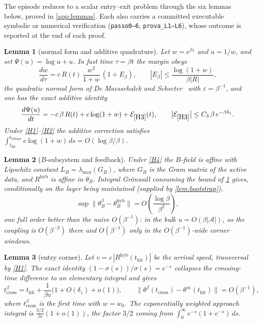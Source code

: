 \documentclass[11pt]{article}
\newtheorem{lemma}[lemma]{Lemma}
\theoremstyle{definition}
\theoremstyle{remark}
\newcommand{\thit}{t_{\mathrm{hit}}}
\newcommand{\trel}{t_{\mathrm{release}}}
\newcommand{\Ar}{\mathcal{A}}                      %
\newcommand{\hyb}{\mathrm{hyb}}
\begin{document}
The episode reduces to a scalar entry--exit problem through the six lemmas below,
proved in \cref{app:lemmas}. Each also carries a committed executable symbolic or
numerical verification (\texttt{passo0--6}, \texttt{prova\_L1--L6}), whose
outcome is reported at the end of each proof.

\begin{lemma}[normal form and additive quadrature]\label{lem:gauge}
Let $w=e^{\beta z}$ and $u=1/w$, and set $\Psi(u)=\log u+u$. In fast time
$\tau=\beta t$ the margin obeys
\begin{equation}\label{eq:normalform}
\frac{dw}{d\tau}=c\,R(t)\,\frac{w^{2}}{1+w}\,(1+E_\beta),
\qquad
|E_\beta|\le\frac{\log(1+w)}{\beta|R|},
\end{equation}
the quadratic normal form of De Maesschalck and Schecter~\cite[equations (1.9),
(1.10)]{DMS16} with $\varepsilon=\beta^{-1}$, and one has the exact additive
identity
\begin{equation}\label{eq:quadrature}
\frac{d\Psi(u)}{dt}=-c\,\beta\,R(t)+c\log(1+w)+\mathcal{E}_{\eqref{H3}}(t),
\qquad
\bigl|\mathcal{E}_{\eqref{H3}}\bigr|\le C_3\,\beta\,e^{-\beta\delta_1}.
\end{equation}
Under \eqref{H1}--\eqref{H2} the additive correction satisfies
$\int_{\thit}^{\trel}c\log(1+w)\,ds=O(\log\beta/\beta)$.
\end{lemma}

\begin{lemma}[$B$-subsystem and feedback]\label{lem:gronwall}
Under \eqref{H4} the $B$-field is affine with Lipschitz constant
$L_B=\lambda_{\max}(G_B)$, where $G_B$ is the Gram matrix of the active data, and
$R^{\hyb}$ is affine in $\theta_B$. Integral Gr\"onwall consuming the bound of
\cref{lem:gauge} gives, conditionally on the layer being maintained (supplied by
\cref{lem:bootstrap}),
\begin{equation}\label{eq:Brate}
\sup\bigl\|\theta_B^\beta-\theta_B^{\hyb}\bigr\|=O\!\left(\frac{\log\beta}{\beta^{2}}\right),
\end{equation}
one full order better than the naive $O(\beta^{-1})$: in the bulk
$u=O(\beta|\Ar|)$, so the coupling is $O(\beta^{-2})$ there and $O(\beta^{-1})$
only in the $O(\beta^{-1})$-wide corner windows.
\end{lemma}

\begin{lemma}[entry corner]\label{lem:corner-in}
Let $v=c\,|R^{\hyb}(\thit)|$ be the arrival speed, transversal by \eqref{H1}. The
exact identity $(1-\sigma(s))/\sigma(s)=e^{-s}$ collapses the crossing-time
difference to an elementary integral and gives
\begin{equation}\label{eq:corner-in}
t_{\mathrm{cross}}^{\beta}=\thit+\frac{1}{\beta v}\bigl(1+O(\delta_z)+o(1)\bigr),
\qquad
\bigl\|\theta^\beta(t_{\mathrm{cross}})-\theta^\infty(\thit)\bigr\|=O(\beta^{-1}),
\end{equation}
where $t^\beta_{\mathrm{cross}}$ is the first time with $w=w_0$. The
exponentially weighted approach integral is $\tfrac{3/2}{\beta v}(1+o(1))$, the
factor $3/2$ coming from $\int_0^\infty e^{-s}(1+e^{-s})\,ds$.
\end{lemma}
\end{document}
